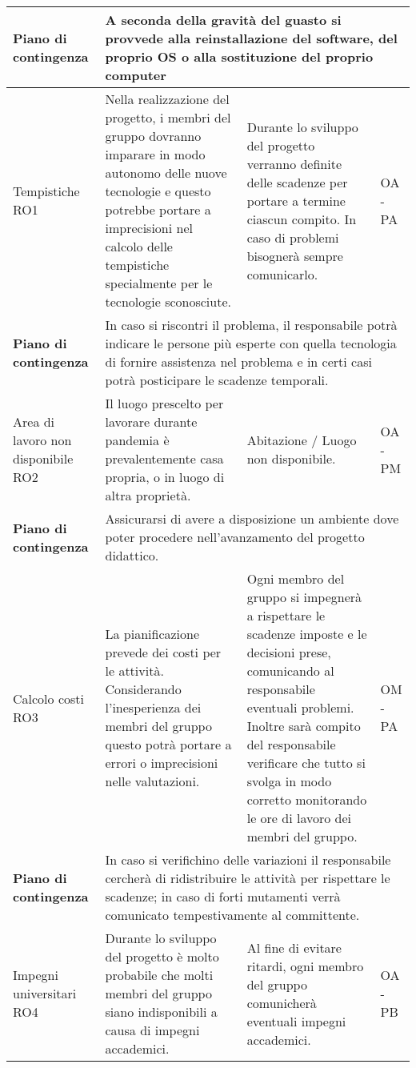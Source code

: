 \begin{center}
\begin{longtable}{|p{}|p{}|p{}|p{}|}
		\hline
		\centering \textbf{Piano di contingenza} & \multicolumn{3}{p{0.84\textwidth}}{A seconda della gravità del guasto si provvede alla reinstallazione del software, del proprio OS o alla sostituzione del proprio computer} \\
		\hline
		\centering Tempistiche RO1& Nella realizzazione del progetto, i membri del gruppo dovranno imparare in modo autonomo delle nuove tecnologie e questo potrebbe portare a imprecisioni nel calcolo delle tempistiche specialmente per le tecnologie sconosciute. & Durante lo sviluppo del progetto verranno definite delle scadenze per portare a termine ciascun compito. In caso di problemi bisognerà sempre comunicarlo. & OA - PA \\
		\hline
		\centering \textbf{Piano di contingenza} & \multicolumn{3}{p{0.84\textwidth}}{In caso si riscontri il problema, il responsabile potrà indicare le persone più esperte con quella tecnologia di fornire assistenza nel problema e in certi casi potrà posticipare le scadenze temporali.} \\
		\hline
		\centering Area di lavoro non disponibile RO2& Il luogo prescelto per lavorare durante pandemia è prevalentemente casa propria, o in luogo di altra proprietà. & Abitazione / Luogo non disponibile. &  OA - PM \\
		\hline
		\centering \textbf{Piano di contingenza} & \multicolumn{3}{p{0.84\textwidth}}{Assicurarsi di avere a disposizione un ambiente dove poter procedere nell'avanzamento del progetto didattico. } \\
		\hline
		\centering Calcolo costi RO3& La pianificazione prevede dei costi per le attività. Considerando l'inesperienza dei membri del gruppo questo potrà portare a errori o imprecisioni nelle valutazioni. & Ogni membro del gruppo si impegnerà a rispettare le scadenze imposte e le decisioni prese, comunicando al responsabile eventuali problemi. Inoltre sarà compito del responsabile verificare che tutto si svolga in modo corretto monitorando le ore di lavoro dei membri del gruppo. & OM - PA\\
		\hline
		\centering \textbf{Piano di contingenza} & \multicolumn{3}{p{0.84\textwidth}}{In caso si verifichino delle variazioni il responsabile cercherà di ridistribuire le attività per rispettare le scadenze; in caso di forti mutamenti verrà comunicato tempestivamente al committente.  } \\
		\hline
		\centering Impegni universitari RO4& Durante lo sviluppo del progetto è molto probabile che molti membri del gruppo siano indisponibili a causa di impegni accademici.  &Al fine di evitare ritardi, ogni membro del gruppo comunicherà eventuali impegni accademici. & OA - PB \\

\end{longtable}
\end{center}
